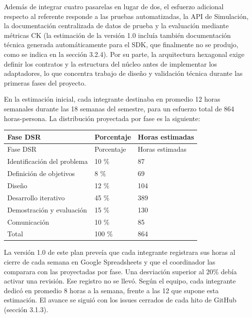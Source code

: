 Además de integrar cuatro pasarelas en lugar de dos, el esfuerzo adicional respecto al referente responde a las pruebas automatizadas, la API de Simulación, la documentación centralizada de datos de prueba y la evaluación mediante métricas CK (la estimación de la versión 1.0 incluía también documentación técnica generada automáticamente para el SDK, que finalmente no se produjo, como se indica en la sección 3.2.4). Por su parte, la arquitectura hexagonal exige definir los contratos y la estructura del núcleo antes de implementar los adaptadores, lo que concentra trabajo de diseño y validación técnica durante las primeras fases del proyecto.

En la estimación inicial, cada integrante destinaba en promedio 12 horas semanales durante las 18 semanas del semestre, para un esfuerzo total de 864 horas-persona. La distribución proyectada por fase es la siguiente:

\begin{center}
\renewcommand{\arraystretch}{1.2}
\SinNumero
\begin{longtable}{|P{0.329}|P{0.157}|P{0.222}|}
  \hline
  Fase DSR & Porcentaje & Horas estimadas \\
  \hline
  \endfirsthead
  \hline
  Fase DSR & Porcentaje & Horas estimadas \\
  \hline
  \endhead
  Identificación del problema & 10 \% & 87 \\
  \hline
  Definición de objetivos & 8 \% & 69 \\
  \hline
  Diseño & 12 \% & 104 \\
  \hline
  Desarrollo iterativo & 45 \% & 389 \\
  \hline
  Demostración y evaluación & 15 \% & 130 \\
  \hline
  Comunicación & 10 \% & 85 \\
  \hline
  Total & 100 \% & 864 \\
  \hline
\end{longtable}
\end{center}

La versión 1.0 de este plan preveía que cada integrante registrara sus horas al cierre de cada semana en Google Spreadsheets y que el coordinador las comparara con las proyectadas por fase. Una desviación superior al 20\% debía activar una revisión. Ese registro no se llevó. Según el equipo, cada integrante dedicó en promedio 8 horas a la semana, frente a las 12 que supone esta estimación. El avance se siguió con los issues cerrados de cada hito de GitHub (sección 3.1.3).
